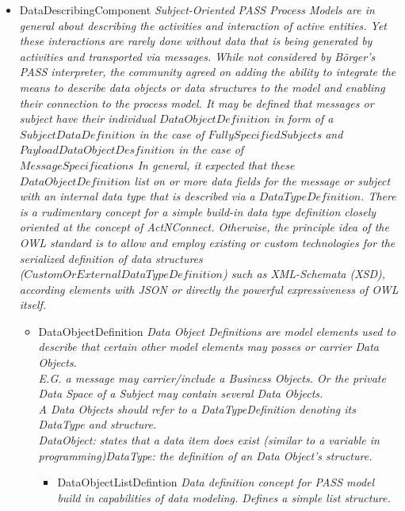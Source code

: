 \begin{itemize}
\begin{itemize}
	\item DataDescribingComponent \linebreak \textit{Subject-Oriented PASS Process Models are in general about describing the activities and interaction of active entities. Yet these interactions are rarely done without data that is being generated by activities and transported via messages. While not considered by Börger's PASS interpreter, the community agreed on adding the ability to integrate the means to describe data objects or data structures to the model and enabling their connection to the process model. It may be defined that messages or subject have their individual $DataObjectDefinition$ in form of a $SubjectDataDefinition$ in the case of $FullySpecifiedSubject$s and \\ $PayloadDataObjectDesfinition$ in the case of \\ $MessageSpecifications$ In general, it expected that these \\ $DataObjectDefinition$ list on or more data fields for the message or subject with an internal data type that is described via a $DataTypeDefinition$. There is a rudimentary concept for a simple build-in data type definition closely oriented at the concept of ActNConnect. Otherwise, the principle idea of the OWL standard is to allow and employ existing or custom technologies for the serialized definition of data structures \\ ($CustomOrExternalDataTypeDefinition$) such as XML-Schemata (XSD), according elements with JSON or directly the powerful expressiveness of OWL itself.}
	\begin{itemize}
		\item DataObjectDefinition \linebreak \textit{Data Object Definitions are model elements used to describe that certain other model elements may posses or carrier Data Objects.\\ E.G. a message may carrier/include a Business Objects. Or the private Data Space of a Subject may contain several Data Objects. \\A Data Objects should refer to a DataTypeDefinition denoting its DataType and structure.\\ DataObject: states that a data item does exist (similar to a variable in programming)DataType: the definition of an Data Object's structure.}
		\begin{itemize}
			\item DataObjectListDefintion \linebreak \textit{Data definition concept for PASS model build in capabilities of data modeling. Defines a simple list structure.}

\end{itemize}
\end{itemize}
\end{itemize}
\end{itemize}
